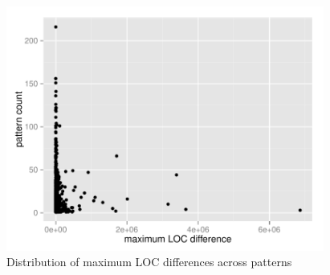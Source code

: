 \begin{figure}[H]
\caption{Distribution of maximum LOC differences across
patterns}\label{figure:pattern_loc_diff}
\centering
	\includegraphics[width=296pt]{images/pattern_loc_diff_100.pdf}
\end{figure}